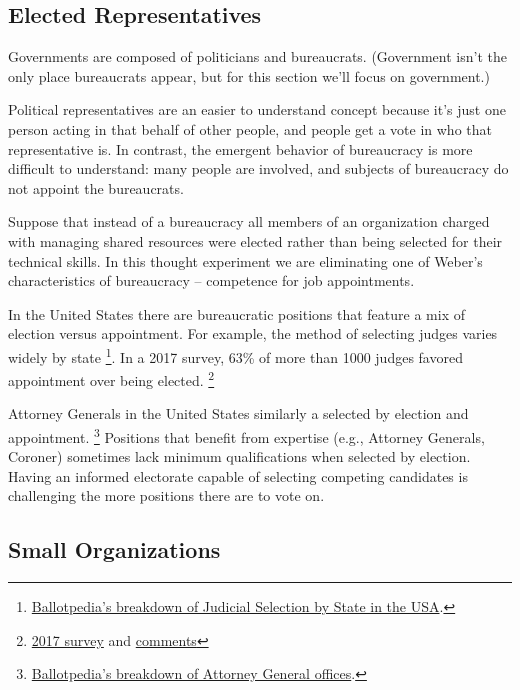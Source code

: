 \subsection*{Elected Representatives}
Governments are composed of politicians and bureaucrats. (Government isn't the only place bureaucrats appear, but for this section we'll focus on government.)

Political representatives are an easier to understand concept because it's just one person acting in that behalf of other people, and people get a vote in who that representative is.
In contrast, the emergent behavior of bureaucracy is more difficult to understand: many people are involved, and subjects of bureaucracy do not appoint the bureaucrats. 

Suppose that instead of a bureaucracy all members of an organization charged with managing shared resources were elected rather than being selected for their technical skills. In this thought experiment we are eliminating one of Weber's characteristics of bureaucracy -- competence for job appointments. 

In the United States there are bureaucratic positions that feature a mix of election versus appointment. For example, the method of selecting judges varies widely by state \footnote{\href{https://ballotpedia.org/Judicial_selection_in_the_states}{Ballotpedia's breakdown of Judicial Selection by State in the USA}.}. In a 2017 survey, 63\% of more than 1000 judges favored appointment over being elected. \footnote{\href{https://www.judges.org/news-and-info/the-age-old-question-should-judges-be-appointed-or-elected-heres-what-you-said/}{2017 survey} and \href{https://www.judges.org/wp-content/uploads/2020/03/Q1_Text.pdf}{comments}}

Attorney Generals in the United States similarly a selected by election and appointment.
\footnote{\href{https://ballotpedia.org/Attorney_General_office_comparison}{Ballotpedia's breakdown of Attorney General offices}.} Positions that benefit from expertise (e.g., Attorney Generals, Coroner) sometimes lack minimum qualifications when selected by election. Having an informed electorate capable of selecting competing candidates is challenging the more positions there are to vote on.

\subsection*{Small Organizations}

